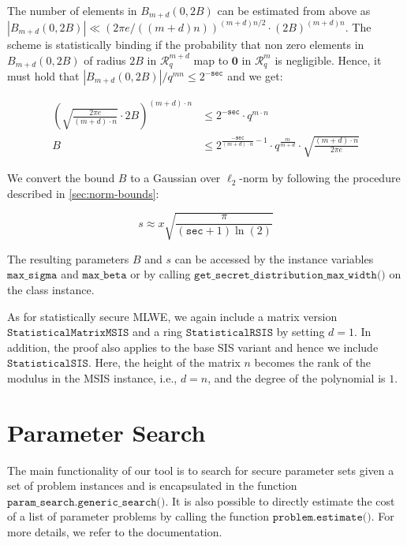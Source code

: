 The number of elements in $B_{m+d}(0, 2B)$ can be estimated from above as $|B_{m+d}(0, 2B)| \ll (2 \pi e /((m+d) n))^{(m+d) n/2} \cdot (2 B)^{(m+d) n}$. The scheme is statistically binding if the probability that non zero elements in $B_{m+d}(0, 2B)$ of radius $2B$ in $\mathcal{R}_q^{m+d}$ map to $\mathbf{0}$ in $\mathcal{R}_q^{m}$ is negligible. Hence, it must hold that $|B_{m+d}(0, 2B)|/q^{m n} \leq 2^{-\texttt{sec}}$ and we get:


\begin{align}
    \left(\sqrt{\frac{2 \pi e}{(m+d) \cdot n}} \cdot 2 B\right)^{(m+d) \cdot n} & \leq 2^{-\texttt{sec}} \cdot q^{m\cdot n}                                                                       \\
    B                                                                           & \leq 2^{\frac{-\texttt{sec}}{(m+d)\cdot n} - 1} \cdot q^\frac{m}{m+d} \cdot \sqrt{\frac{(m+d)\cdot n}{2 \pi e}}
\end{align}

We convert the bound $B$ to a Gaussian over $\ell_2$-norm by following the procedure described in \cref{sec:norm-bounds}: %

\begin{equation}
    s  \approx x \sqrt{\frac{\pi}{(\texttt{sec} + 1) \ln(2)}}
\end{equation}

The resulting parameters $B$ and $s$ can be accessed by the instance variables $\texttt{max\_sigma}$ and $\texttt{max\_beta}$ or by calling $\texttt{get\_secret\_distribution\_max\_width()}$ on the class instance.

As for statistically secure MLWE, we again include a matrix version $\texttt{StatisticalMatrixMSIS}$ and a ring $\texttt{StatisticalRSIS}$ by setting $d=1$. In addition, the proof also applies to the base SIS variant and hence we include $\texttt{StatisticalSIS}$. Here, the height of the matrix $n$ becomes the rank of the modulus in the MSIS instance, i.e., $d=n$, and the degree of the polynomial is $1$.



\section{Parameter Search}
The main functionality of our tool is to search for secure parameter sets given a set of problem instances and is encapsulated in the function $\texttt{param\_search.generic\_search()}$. It is also possible to directly estimate the cost of a list of parameter problems by calling the function $\texttt{problem.estimate()}$. For more details, we refer to the documentation.

